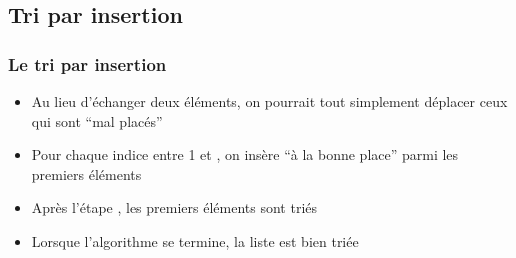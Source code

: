 \documentclass[12pt]{linfo-beamer}
\begin{document}
\subsection{Tri par insertion}
\label{sub:tri_par_insertion}

\begin{frame}
  \frametitle{Le tri par insertion}

  \begin{itemize}

  \item Au lieu d'échanger deux éléments, on pourrait tout simplement
    déplacer ceux qui sont ``mal placés''

    \medskip

  \item Pour chaque indice  entre 1 et , on
    insère  ``à la bonne place'' parmi les 
    premiers éléments

    \medskip

  \item Après l'étape , les  premiers éléments sont triés
  \item Lorsque l'algorithme se termine, la liste est bien triée

  \end{itemize}
\end{frame}

\end{document}
